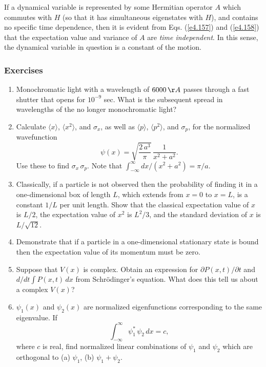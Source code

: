 If a dynamical variable is represented by some Hermitian operator $A$ which
commutes with $H$ (so that it has simultaneous eigenstates with $H$), and
contains no specific time dependence, then it is evident from Eqs. (\ref{e4.157}) and (\ref{e4.158}) that the expectation value and
variance of $A$ are {\em time independent}. In this sense, the dynamical
variable in question is a constant of the motion.

\subsubsection*{Exercises}
{\small
\begin{enumerate}
\item Monochromatic light with a wavelength of $6000\,\AA$ passes
through a fast shutter that opens for $10^{-9}$ sec. What is the
subsequent spread in wavelengths of the no longer monochromatic light?


\item Calculate $\langle x\rangle$, $\langle x^2\rangle$, and $\sigma_x$, as
well as $\langle p\rangle$, $\langle p^2\rangle$, and $\sigma_p$,
for the normalized wavefunction
$$
\psi(x) = \sqrt{\frac{2\,a^3}{\pi}}\,\frac{1}{x^2+a^2}.
$$
Use these to find $\sigma_x\,\sigma_p$. Note that $\int_{-\infty}^{\infty} dx/(x^2+a^2) = \pi/a$.


\item Classically, if a particle is not observed then the probability of finding it
in a one-dimensional box of length $L$, which extends from $x=0$ to $x=L$, is a constant $1/L$ per unit length.
Show that the classical expectation value of $x$ is $L/2$, the expectation value of 
$x^2$ is $L^2/3$, and the standard deviation of $x$ is $L/\sqrt{12}$. 


\item Demonstrate that if a particle in a one-dimensional stationary state is bound then the
expectation value of its momentum must be zero. 

\item Suppose that $V(x)$ is complex. Obtain an expression for $\partial P(x,t)/\partial t$ and $d/dt \int P(x,t)\,dx$ from Schr\"{o}dinger's equation.  What does this tell us about a complex $V(x)$? 

\item $\psi_1(x)$ and $\psi_2(x)$ are normalized eigenfunctions corresponding to
the same eigenvalue. If
$$
\int_{-\infty}^\infty \psi_1^\ast\,\psi_2\,dx = c,
$$
where $c$ is real, find normalized linear combinations of $\psi_1$ and
$\psi_2$ which are orthogonal to (a) $\psi_1$, (b) $\psi_1+\psi_2$.



\end{enumerate}}
